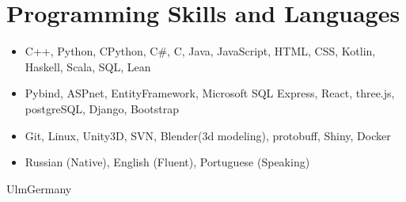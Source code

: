 \documentclass[11pt,a4paper,sans]{moderncv}
\begin{document}
	\section{Programming Skills and Languages}
		\begin{itemize}
			\item C++, Python, CPython, C\#, C, Java, JavaScript, HTML, CSS, Kotlin, Haskell, Scala, SQL, Lean
			\item Pybind, ASPnet, EntityFramework, Microsoft SQL Express, React, three.js, postgreSQL, Django, Bootstrap
			\item Git, Linux, Unity3D, SVN, Blender(3d modeling), protobuff, Shiny, Docker
			\item Russian (Native), English (Fluent), Portuguese (Speaking)
		\end{itemize}
		
		\vspace*{\fill}
		\name{}{}
		\title{}
		\address{Bismarckring, 64}{Ulm}{Germany}
		\makecvtitle
	
\end{document}
